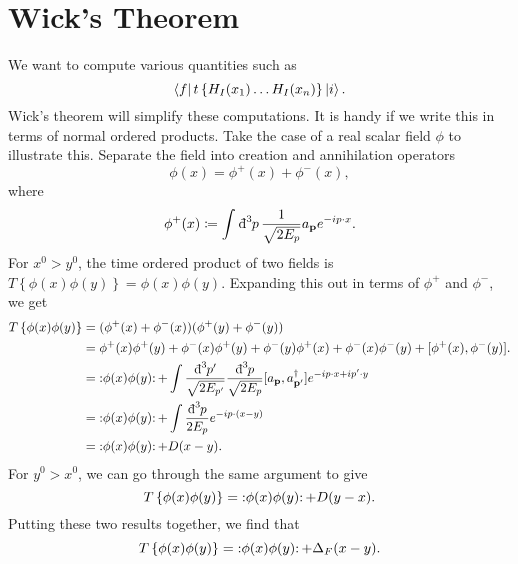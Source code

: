 
\section{Wick's Theorem}%
\label{sec:wick_s_theorem}

We want to compute various quantities such as 
\begin{equation}
  \bra{f} t \left\{ H_I (x_1) \dots H_I(x_n) \right\} \ket{i}.
\end{equation}
Wick's theorem will simplify these computations.
It is handy if we write this in terms of normal ordered products.
Take the case of a real scalar field $\phi$ to illustrate this.
Separate the field into creation and annihilation operators
\begin{equation}
  \phi(x) = \phi^+(x) + \phi^-(x),
\end{equation}
where
\begin{equation}
  \phi^+(x) \coloneqq \int_{}^{} \bdd[3]{p} \frac{1}{\sqrt{2 E_p}} a_{\vb{p}} e^{-ip \cdot x}.
\end{equation}
For $x^0 > y^0$, the time ordered product of two fields is $T \left\{ \phi(x) \phi(y) \right\} = \phi(x) \phi(y)$.
Expanding this out in terms of $\phi^+$ and $\phi^-$, we get
\begin{align}
  T \left\{ \phi(x) \phi(y) \right\} &= (\phi^+(x) + \phi^-(x)) (\phi^+(y) + \phi^-(y)) \\
				     &=\phi^+(x) \phi^+(y) + \phi^-(x) \phi^+(y) + \phi^-(y) \phi^+(x) + \phi^-(x) \phi^-(y) + [\phi^+(x), \phi^-(y)]. \\
				     &= \normalorder{\phi(x) \phi(y) } + \int \frac{\bdd[3]{p'}}{\sqrt{2 E_{p'}}} \frac{\bdd[3]{p}}{\sqrt{2 E_p}} [a_{\vb{p}}, a_{\vb{p}'}^{\dagger}] e^{-i p \cdot x + i p' \cdot y} \\
				     &= \normalorder{\phi(x) \phi(y) } + \int \frac{\bdd[3]{p}}{2 E_p} e^{-ip \cdot (x - y)} \\
				     &= \normalorder{\phi(x) \phi(y) } + D(x - y).
\end{align}
For $y^0 > x^0$, we can go through the same argument to give
\begin{equation}
  T \left\{ \phi(x) \phi(y) \right\} = \normalorder{\phi(x) \phi(y) } + D(y - x).
\end{equation}
Putting these two results together, we find that
\begin{equation}
  T \left\{ \phi(x) \phi(y) \right\} = \normalorder{\phi(x) \phi(y) } + \Delta_F(x - y).
\end{equation}
